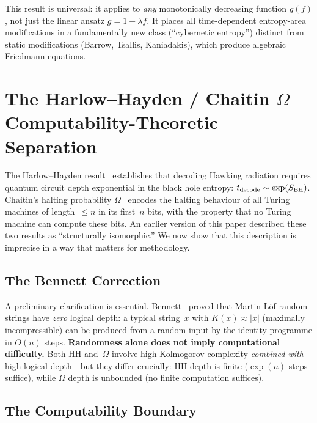 \documentclass[12pt,a4paper]{article}
\theoremstyle{remark}
\begin{document}
This result is universal: it applies to \emph{any} monotonically decreasing function $g(f)$, not just the linear ansatz $g = 1 - \lambda f$.
It places all time-dependent entropy-area modifications in a fundamentally new class (``cybernetic entropy'') distinct from static modifications (Barrow, Tsallis, Kaniadakis), which produce algebraic Friedmann equations.


\section{The Harlow--Hayden / Chaitin $\Omega$ Computability-Theoretic Separation}
\label{sec:hierarchy}

The Harlow--Hayden result~\cite{HarlowHayden2013} establishes that decoding Hawking radiation requires quantum circuit depth exponential in the black hole entropy: $t_{\rm decode} \sim \exp(S_{\rm BH})$.
Chaitin's halting probability $\Omega$~\cite{Chaitin1975} encodes the halting behaviour of all Turing machines of length~$\le n$ in its first~$n$ bits, with the property that no Turing machine can compute these bits.
An earlier version of this paper described these two results as ``structurally isomorphic.''
We now show that this description is imprecise in a way that matters for methodology.

\subsection{The Bennett Correction}

A preliminary clarification is essential.
Bennett~\cite{Bennett1988} proved that Martin-L\"of random strings have \emph{zero} logical depth: a typical string~$x$ with $K(x)\approx |x|$ (maximally incompressible) can be produced from a random input by the identity programme in $O(n)$ steps.
\textbf{Randomness alone does not imply computational difficulty.}
Both HH and~$\Omega$ involve high Kolmogorov complexity \emph{combined with} high logical depth---but they differ crucially: HH depth is finite ($\exp(n)$ steps suffice), while $\Omega$ depth is unbounded (no finite computation suffices).

\subsection{The Computability Boundary}
\end{document}
